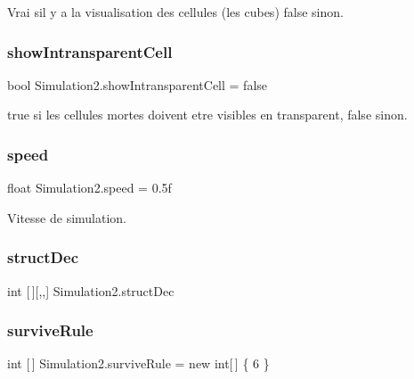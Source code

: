 Vrai s\textquotesingle{}il y a la visualisation des cellules (les cubes) false sinon. 

\mbox{\label{class_simulation2_a0a82650af5163435eb703b67df1407fb}} 
\subsubsection{\texorpdfstring{show\+Intransparent\+Cell}{showIntransparentCell}}
{\footnotesize\ttfamily bool Simulation2.\+show\+Intransparent\+Cell = false}



true si les cellules mortes doivent etre visibles en transparent, false sinon. 

\mbox{\label{class_simulation2_ad5211ec4fe39100128b77239da0aae3f}} 
\subsubsection{\texorpdfstring{speed}{speed}}
{\footnotesize\ttfamily float Simulation2.\+speed = 0.\+5f}



Vitesse de simulation. 

\mbox{\label{class_simulation2_ad4246f77655a4f827a7f22ffa4d95d97}} 
\subsubsection{\texorpdfstring{struct\+Dec}{structDec}}
{\footnotesize\ttfamily int \mbox{[}$\,$\mbox{]}\mbox{[},,\mbox{]} Simulation2.\+struct\+Dec}

\mbox{\label{class_simulation2_a8e264ac14adf969b72d37a3006c9981f}} 
\subsubsection{\texorpdfstring{survive\+Rule}{surviveRule}}
{\footnotesize\ttfamily int \mbox{[}$\,$\mbox{]} Simulation2.\+survive\+Rule = new int\mbox{[}$\,$\mbox{]} \{ 6 \}}



